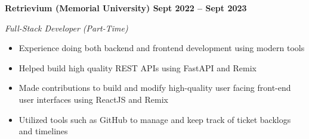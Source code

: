 \vspace{0.1cm}
\textbf{Retrievium (Memorial University) \hfill Sept 2022 -- Sept 2023} \par
\textit{Full-Stack Developer (Part-Time)} \par
\begin{itemize}
    \item Experience doing both backend and frontend development using modern tools
    \item Helped build high quality REST APIs using FastAPI and Remix
    \item Made contributions to build and modify high-quality user facing front-end user interfaces using ReactJS and Remix
    \item Utilized tools such as GitHub to manage and keep track of ticket backlogs and timelines
\end{itemize} \par